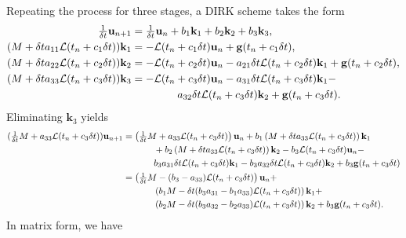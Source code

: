 \documentclass[a4paper,10pt]{article}
\begin{document}
Repeating the process for three stages, a DIRK scheme takes the form
%
\begin{align*}
\tfrac{1}{\delta t}\mathbf{u}_{n+1} & = \tfrac{1}{\delta t}\mathbf{u}_{n} + b_1\mathbf{k}_1 + b_2\mathbf{k}_2 + b_3\mathbf{k}_3, \\
(M + \delta t a_{11}\mathcal{L}(t_n+c_1\delta t))\mathbf{k}_1 & = -\mathcal{L}(t_n+c_1\delta t) \mathbf{u}_n + \mathbf{g}(t_n+c_1\delta t), \\
(M + \delta t a_{22}\mathcal{L}(t_n+c_2\delta t))\mathbf{k}_2 & = -\mathcal{L}(t_n+c_2\delta t) \mathbf{u}_n -
	a_{21}\delta t\mathcal{L}(t_n+c_2\delta t) \mathbf{k}_1 + \mathbf{g}(t_n+c_2\delta t), \\
(M + \delta t a_{33}\mathcal{L}(t_n+c_3\delta t))\mathbf{k}_3 & = -\mathcal{L}(t_n+c_3\delta t) \mathbf{u}_n -
	a_{31}\delta t\mathcal{L}(t_n+c_3\delta t) \mathbf{k}_1 - \\&\hspace{10ex}a_{32}\delta t\mathcal{L}(t_n+c_3\delta t) \mathbf{k}_2 + \mathbf{g}(t_n+c_3\delta t). 
\end{align*}
%
Eliminating $\mathbf{k}_3$ yields
%
\begin{align*}
(\tfrac{1}{\delta t}M + a_{33}\mathcal{L}(t_n+c_3\delta t))\mathbf{u}_{n+1} & =
	\left(\tfrac{1}{\delta t}M + a_{33}\mathcal{L}(t_n+c_3\delta t)\right)\mathbf{u}_{n} + 
	b_1\left(M + \delta t a_{33}\mathcal{L}(t_n+c_3\delta t)\right)\mathbf{k}_{1}
	\\ & \hspace{8ex} + b_2\left(M + \delta t a_{33}\mathcal{L}(t_n+c_3\delta t)\right)\mathbf{k}_{2} - b_3\mathcal{L}(t_n+c_3\delta t) \mathbf{u}_n -
	\\ & \hspace{8ex} b_3a_{31}\delta t\mathcal{L}(t_n+c_3\delta t) \mathbf{k}_1 - 
	b_3a_{32}\delta t\mathcal{L}(t_n+c_3\delta t) \mathbf{k}_2 + b_3\mathbf{g}(t_n+c_3\delta t) \\
& = \left(\tfrac{1}{\delta t}M - (b_3-a_{33})\mathcal{L}(t_n+c_3\delta t)\right)\mathbf{u}_{n} + 
	\\ & \hspace{8ex}\left(b_1M - \delta t( b_3a_{31}- b_1a_{33})\mathcal{L}(t_n+c_3\delta t)\right)\mathbf{k}_{1} +
	\\ & \hspace{8ex}\left(b_2M - \delta t (b_3a_{32} - b_2a_{33})\mathcal{L}(t_n+c_3\delta t)\right)\mathbf{k}_{2} + b_3\mathbf{g}(t_n+c_3\delta t).
\end{align*}
%
In matrix form, we have
%
\end{document}
